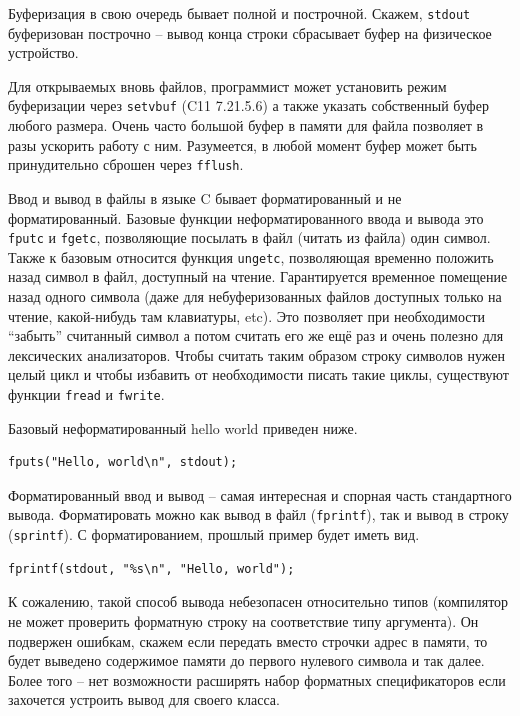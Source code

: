 \documentclass[a4paper,12pt,oneside]{article}
\begin{document}
Буферизация в свою очередь бывает полной и построчной. Скажем, \lstinline!stdout! буферизован построчно -- вывод конца строки сбрасывает буфер на физическое устройство.

Для открываемых вновь файлов, программист может установить режим буферизации через \lstinline!setvbuf! (C11 7.21.5.6) а также указать собственный буфер любого размера. Очень часто большой буфер в памяти для файла позволяет в разы ускорить работу с ним. Разумеется, в любой момент буфер может быть принудительно сброшен через \lstinline!fflush!.

Ввод и вывод в файлы в языке C бывает форматированный и не форматированный. Базовые функции неформатированного ввода и вывода это \lstinline!fputc! и \lstinline!fgetc!, позволяющие посылать в файл (читать из файла) один символ. Также к базовым относится функция \lstinline!ungetc!, позволяющая временно положить назад символ в файл, доступный на чтение. Гарантируется временное помещение назад одного символа (даже для небуферизованных файлов доступных только на чтение, какой-нибудь там клавиатуры, etc). Это позволяет при необходимости ``забыть'' считанный символ а потом считать его же ещё раз и очень полезно для лексических анализаторов. Чтобы считать таким образом строку символов нужен целый цикл и чтобы избавить от необходимости писать такие циклы, существуют функции \lstinline!fread! и \lstinline!fwrite!. 

Базовый неформатированный hello world приведен ниже.

\begin{lstlisting}
fputs("Hello, world\n", stdout);
\end{lstlisting}

Форматированный ввод и вывод -- самая интересная и спорная часть стандартного вывода. Форматировать можно как вывод в файл (\lstinline!fprintf!), так и вывод в строку (\lstinline!sprintf!). С форматированием, прошлый пример будет иметь вид.

\begin{lstlisting}
fprintf(stdout, "%s\n", "Hello, world");
\end{lstlisting}

К сожалению, такой способ вывода небезопасен относительно типов (компилятор не может проверить форматную строку на соответствие типу аргумента). Он подвержен ошибкам, скажем если передать вместо строчки адрес в памяти, то будет выведено содержимое памяти до первого нулевого символа и так далее. Более того -- нет возможности расширять набор форматных спецификаторов если захочется устроить вывод для своего класса.
\end{document}
